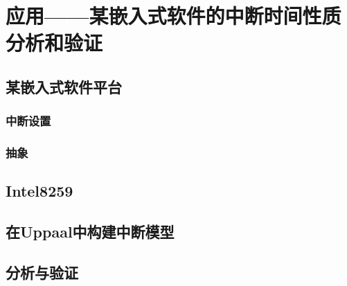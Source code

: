 
\chapter{应用——某嵌入式软件的中断时间性质分析和验证}
\label{cha:case}

\section{某嵌入式软件平台}
\label{sec:senario}

\subsection{中断设置}
\label{subsec:intr_setting}

\subsection{抽象}
\label{subsec:abstract}

\section{Intel8259}
\label{sec:8259}

\section{在Uppaal中构建中断模型}
\label{sec:build}

\section{分析与验证}
\label{sec:experiment}
